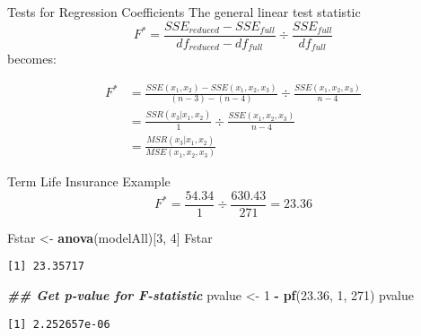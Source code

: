 \documentclass[
  ignorenonframetext,
]{beamer}
\newenvironment{Shaded}{\begin{snugshade}}{\end{snugshade}}
\newcommand{\DecValTok}[1]{\textcolor[rgb]{0.00,0.00,0.81}{#1}}
\newcommand{\DocumentationTok}[1]{\textcolor[rgb]{0.56,0.35,0.01}{\textbf{\textit{#1}}}}
\newcommand{\FloatTok}[1]{\textcolor[rgb]{0.00,0.00,0.81}{#1}}
\newcommand{\FunctionTok}[1]{\textcolor[rgb]{0.13,0.29,0.53}{\textbf{#1}}}
\newcommand{\NormalTok}[1]{#1}
\newcommand{\OtherTok}[1]{\textcolor[rgb]{0.56,0.35,0.01}{#1}}
\newcommand{\SpecialCharTok}[1]{\textcolor[rgb]{0.81,0.36,0.00}{\textbf{#1}}}
\begin{document}
\begin{frame}{Tests for Regression Coefficients}
\protect\hypertarget{tests-for-regression-coefficients-2}{}
The general linear test statistic
\[F^*=\frac{SSE_{reduced}-SSE_{full}}{df_{reduced}-df_{full}}\div \frac{SSE_{full}}{df_{full}}\]
becomes:

\[  \begin{array}{ll}
F^* &= \frac{SSE(x_1,x_2)-SSE(x_1,x_2,x_3)}{(n-3)-(n-4)}\div \frac{SSE(x_1,x_2,x_3)}{n-4}\\ 
&=\frac{SSR(x_3|x_1,x_2)}{1}\div \frac{SSE(x_1,x_2,x_3)}{n-4} \\
&=\frac{MSR(x_3|x_1,x_2)}{MSE(x_1,x_2,x_3)}
\end{array}\]
\end{frame}

\begin{frame}[fragile]{Term Life Insurance Example}
\protect\hypertarget{term-life-insurance-example-2}{}
\[F^*=\frac{54.34}{1}\div \frac{630.43}{271}=23.36\] \normalsize

\begin{Shaded}
\begin{Highlighting}[]
\NormalTok{Fstar }\OtherTok{\textless{}{-}} \FunctionTok{anova}\NormalTok{(modelAll)[}\DecValTok{3}\NormalTok{, }\DecValTok{4}\NormalTok{]}
\NormalTok{Fstar}
\end{Highlighting}
\end{Shaded}

\begin{verbatim}
[1] 23.35717
\end{verbatim}

\begin{Shaded}
\begin{Highlighting}[]
\DocumentationTok{\#\# Get p{-}value for F{-}statistic}
\NormalTok{pvalue }\OtherTok{\textless{}{-}} \DecValTok{1} \SpecialCharTok{{-}} \FunctionTok{pf}\NormalTok{(}\FloatTok{23.36}\NormalTok{, }\DecValTok{1}\NormalTok{, }\DecValTok{271}\NormalTok{)}
\NormalTok{pvalue}
\end{Highlighting}
\end{Shaded}

\begin{verbatim}
[1] 2.252657e-06
\end{verbatim}

\normalsize
\end{frame}
\end{document}
